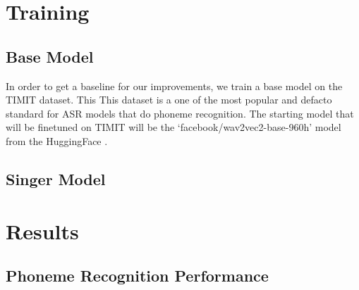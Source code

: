 \documentclass[letterpaper, 12pt]{article}
\begin{document}
\begin{multicols*}{2}

\section{Training}

\subsection{Base Model}
In order to get a baseline for our improvements, we train a base model on the TIMIT dataset. This
This dataset is a one of the most popular and defacto standard for ASR models that do phoneme
recognition. The starting model that will be finetuned on TIMIT will be the `facebook/wav2vec2-base-960h'
model from the HuggingFace \citep{huggingFaceWav2vec2}.

\subsection{Singer Model}


\section{Results}

\subsection{Phoneme Recognition Performance}


\end{multicols*}
\end{document}

